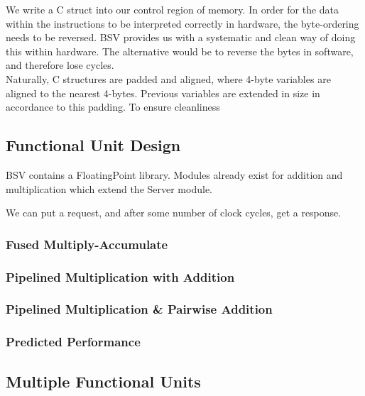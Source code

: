 \documentclass[a4paper,9pt]{report}
\begin{document}
We write a C struct into our control region of memory. In order for the data
within the instructions to be interpreted correctly in hardware, the
byte-ordering needs to be reversed. BSV provides us with a systematic and clean
way of doing this within hardware. The alternative would be to reverse the bytes
in software, and therefore lose cycles. \\


Naturally, C structures are padded and aligned, where 4-byte variables are
aligned to the nearest 4-bytes. Previous variables are extended in size in
accordance to this padding. To ensure cleanliness 

\subsection{Functional Unit Design}
BSV contains a FloatingPoint library. Modules already exist for addition and
multiplication which extend the Server module. 

We can put a request, and after some number of clock cycles, get a response.

\subsubsection{Fused Multiply-Accumulate}


\subsubsection{Pipelined Multiplication with Addition}
\subsubsection{Pipelined Multiplication \& Pairwise Addition}
\subsubsection{Predicted Performance}


\subsection{Multiple Functional Units}
\end{document}
